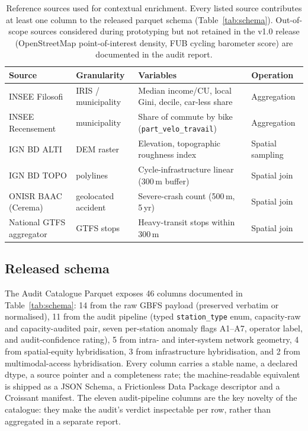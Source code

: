 \documentclass[11pt,a4paper]{article}
\begin{document}
\begin{table}[ht]
\centering
\caption{Reference sources used for contextual enrichment. Every
listed source contributes at least one column to the released
parquet schema (Table~\ref{tab:schema}). Out-of-scope sources
considered during prototyping but not retained in the v1.0
release (OpenStreetMap point-of-interest density, FUB cycling
barometer score) are documented in the audit report.}
\label{tab:sources}
\small
\begin{tabular}{@{}llll@{}}
\toprule
\textbf{Source} & \textbf{Granularity} & \textbf{Variables} &
\textbf{Operation}\\
\midrule
INSEE Filosofi      & IRIS / municipality &
   Median income/CU, local Gini, decile, car-less share & Aggregation \\
INSEE Recensement   & municipality &
   Share of commute by bike (\texttt{part\_velo\_travail})  & Aggregation \\
IGN BD ALTI         & DEM raster &
   Elevation, topographic roughness index & Spatial sampling \\
IGN BD TOPO         & polylines &
   Cycle-infrastructure linear (300\,m buffer) & Spatial join \\
ONISR BAAC (Cerema) & geolocated accident &
   Severe-crash count (500\,m, 5\,yr) & Spatial join \\
National GTFS aggregator & GTFS stops &
   Heavy-transit stops within 300\,m & Spatial join \\
\bottomrule
\end{tabular}
\end{table}

\subsection{Released schema}
The Audit Catalogue Parquet exposes 46 columns documented in
Table~\ref{tab:schema}: 14 from the raw GBFS payload (preserved
verbatim or normalised), 11 from the audit pipeline (typed
\texttt{station\_type} enum, capacity-raw and capacity-audited
pair, seven per-station anomaly flags A1--A7, operator label, and
audit-confidence rating), 5 from intra- and inter-system network
geometry, 4 from spatial-equity hybridisation, 3 from infrastructure
hybridisation, and 2 from multimodal-access hybridisation. Every
column carries a stable name, a declared dtype, a source pointer
and a completeness rate; the machine-readable equivalent is shipped
as a JSON Schema, a Frictionless Data Package descriptor and a
Croissant manifest. The eleven audit-pipeline columns are the
key novelty of the catalogue: they make the audit's verdict
inspectable per row, rather than aggregated in a separate report.
\end{document}
